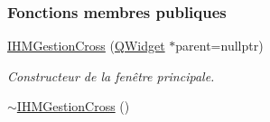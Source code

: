\subsubsection*{Fonctions membres publiques}
\begin{DoxyCompactItemize}
\item 
\hyperlink{class_i_h_m_gestion_cross_a2c62fd83326a87456a403f46acc408c8}{I\+H\+M\+Gestion\+Cross} (\hyperlink{class_q_widget}{Q\+Widget} $\ast$parent=nullptr)
\begin{DoxyCompactList}\small\item\em Constructeur de la fenêtre principale. \end{DoxyCompactList}\item 
\hyperlink{class_i_h_m_gestion_cross_a47cc1d5e80bea3d5e3396a8c16158c45}{$\sim$\+I\+H\+M\+Gestion\+Cross} ()
\end{DoxyCompactItemize}
